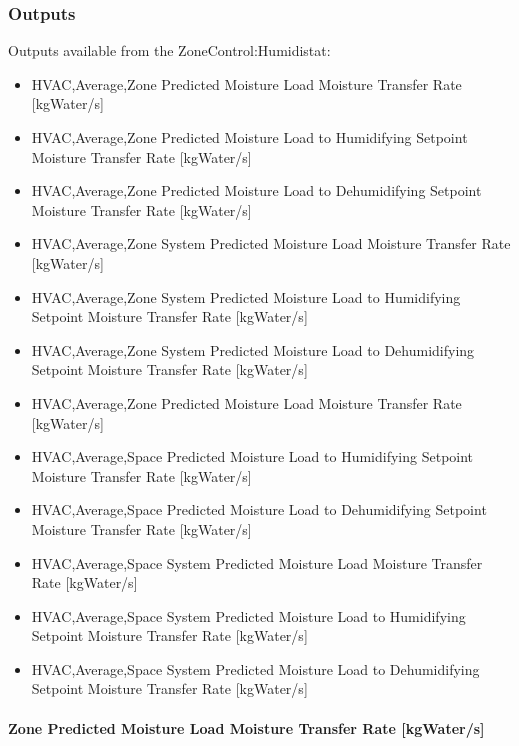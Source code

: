 \subsubsection{Outputs}\label{outputs-2-027}

Outputs available from the ZoneControl:Humidistat:

\begin{itemize}
\item
  HVAC,Average,Zone Predicted Moisture Load Moisture Transfer Rate {[}kgWater/s{]}
\item
  HVAC,Average,Zone Predicted Moisture Load to Humidifying Setpoint Moisture Transfer Rate {[}kgWater/s{]}
\item
  HVAC,Average,Zone Predicted Moisture Load to Dehumidifying Setpoint Moisture Transfer Rate {[}kgWater/s{]}
\item
  HVAC,Average,Zone System Predicted Moisture Load Moisture Transfer Rate {[}kgWater/s{]}
\item
  HVAC,Average,Zone System Predicted Moisture Load to Humidifying Setpoint Moisture Transfer Rate {[}kgWater/s{]}
\item
  HVAC,Average,Zone System Predicted Moisture Load to Dehumidifying Setpoint Moisture Transfer Rate {[}kgWater/s{]}
\item
  HVAC,Average,Zone Predicted Moisture Load Moisture Transfer Rate {[}kgWater/s{]}
\item
  HVAC,Average,Space Predicted Moisture Load to Humidifying Setpoint Moisture Transfer Rate {[}kgWater/s{]}
\item
  HVAC,Average,Space Predicted Moisture Load to Dehumidifying Setpoint Moisture Transfer Rate {[}kgWater/s{]}
\item
  HVAC,Average,Space System Predicted Moisture Load Moisture Transfer Rate {[}kgWater/s{]}
\item
  HVAC,Average,Space System Predicted Moisture Load to Humidifying Setpoint Moisture Transfer Rate {[}kgWater/s{]}
\item
  HVAC,Average,Space System Predicted Moisture Load to Dehumidifying Setpoint Moisture Transfer Rate {[}kgWater/s{]}
\end{itemize}

\paragraph{Zone Predicted Moisture Load Moisture Transfer Rate {[}kgWater/s{]}}

